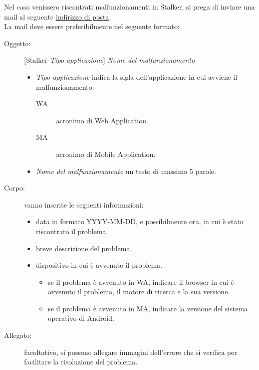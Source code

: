 \documentclass[../manuale-utente.tex]{subfiles}
\begin{document}
Nel caso venissero riscontrati malfunzionamenti in Stalker, si prega di inviare una mail al seguente \href{mailto:gruppone.swe@gmail.com}{indirizzo di posta}.\\
La mail deve essere preferibilmente nel seguente formato:
\begin{description}
    \item[Oggetto:] [Stalker-\textit{Tipo applicazione}] \textit{Nome del malfunzionamento}
    \begin{itemize}
        \item \textit{Tipo applicazione} indica la sigla dell'applicazione in cui avviene il malfunzionamento:
        \begin{description}
            \item[WA] acronimo di Web Application.
            \item[MA] acronimo di Mobile Application.
        \end{description}
        \item \textit{Nome del malfunzionamento} un testo di massimo 5 parole.
    \end{itemize}

    \item[Corpo:] vanno inserite le seguenti informazioni:
    \begin{itemize}
        \item data in formato YYYY-MM-DD, e possibilmente ora, in cui è stato riscontrato il problema.
        \item breve descrizione del problema.
        \item dispositivo in cui è avvenuto il problema.
        \begin{itemize}
            \item se il problema è avvenuto in WA, indicare il browser in cui è avvenuto il problema, il motore di ricerca e la sua versione.
            \item se il problema è avvenuto in MA, indicare la versione del sistema operativo di Android.
        \end{itemize}
    \end{itemize}

    \item[Allegato:] facoltativo, si possono allegare immagini dell'errore che si verifica per facilitare la risoluzione del problema.
\end{description}
\end{document}
